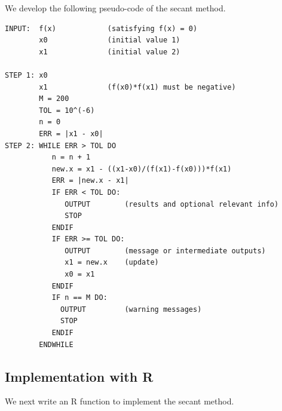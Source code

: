 \documentclass[
]{book}
\begin{document}
We develop the following pseudo-code of the secant method.

\begin{verbatim}
INPUT:  f(x)            (satisfying f(x) = 0)
        x0              (initial value 1)
        x1              (initial value 2)

STEP 1: x0
        x1              (f(x0)*f(x1) must be negative)
        M = 200
        TOL = 10^(-6)
        n = 0
        ERR = |x1 - x0|  
STEP 2: WHILE ERR > TOL DO
           n = n + 1
           new.x = x1 - ((x1-x0)/(f(x1)-f(x0)))*f(x1)
           ERR = |new.x - x1|
           IF ERR < TOL DO:
              OUTPUT        (results and optional relevant info)
              STOP
           ENDIF
           IF ERR >= TOL DO:
              OUTPUT        (message or intermediate outputs)
              x1 = new.x    (update)
              x0 = x1
           ENDIF
           IF n == M DO:
             OUTPUT         (warning messages)
             STOP
           ENDIF
        ENDWHILE
\end{verbatim}

\hypertarget{implementation-with-r}{%
\subsection{Implementation with R}\label{implementation-with-r}}

We next write an R function to implement the secant method.
\end{document}
